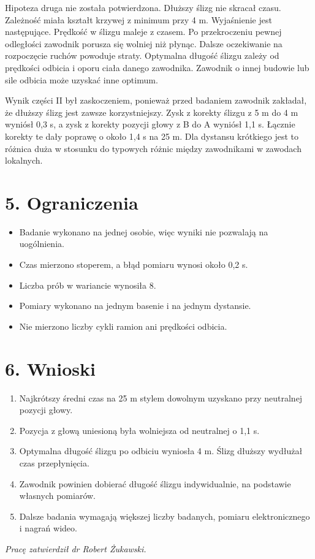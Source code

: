 Hipoteza druga nie została potwierdzona. Dłuższy ślizg nie skracał czasu. Zależność miała kształt krzywej z minimum przy 4 m. Wyjaśnienie jest następujące. Prędkość w ślizgu maleje z czasem. Po przekroczeniu pewnej odległości zawodnik porusza się wolniej niż płynąc. Dalsze oczekiwanie na rozpoczęcie ruchów powoduje straty. Optymalna długość ślizgu zależy od prędkości odbicia i oporu ciała danego zawodnika. Zawodnik o innej budowie lub sile odbicia może uzyskać inne optimum.

Wynik części II był zaskoczeniem, ponieważ przed badaniem zawodnik zakładał, że dłuższy ślizg jest zawsze korzystniejszy. Zysk z korekty ślizgu z 5 m do 4 m wyniósł 0,3 s, a zysk z korekty pozycji głowy z B do A wyniósł 1,1 s. Łącznie korekty te dały poprawę o około 1,4 s na 25 m. Dla dystansu krótkiego jest to różnica duża w stosunku do typowych różnic między zawodnikami w zawodach lokalnych.

\section*{5. Ograniczenia}
\begin{itemize}
\item Badanie wykonano na jednej osobie, więc wyniki nie pozwalają na uogólnienia.
\item Czas mierzono stoperem, a błąd pomiaru wynosi około 0,2 s.
\item Liczba prób w wariancie wynosiła 8.
\item Pomiary wykonano na jednym basenie i na jednym dystansie.
\item Nie mierzono liczby cykli ramion ani prędkości odbicia.
\end{itemize}

\section*{6. Wnioski}
\begin{enumerate}
\item Najkrótszy średni czas na 25 m stylem dowolnym uzyskano przy neutralnej pozycji głowy.
\item Pozycja z głową uniesioną była wolniejsza od neutralnej o 1,1 s.
\item Optymalna długość ślizgu po odbiciu wyniosła 4 m. Ślizg dłuższy wydłużał czas przepłynięcia.
\item Zawodnik powinien dobierać długość ślizgu indywidualnie, na podstawie własnych pomiarów.
\item Dalsze badania wymagają większej liczby badanych, pomiaru elektronicznego i nagrań wideo.
\end{enumerate}

\vspace{0.4cm}
\textit{Pracę zatwierdził dr Robert Żukawski.}